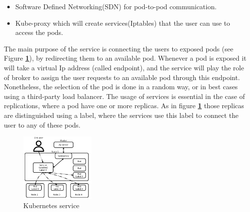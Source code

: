 \documentclass[letterpaper,twocolumn,10pt]{article}
\let\origref\ref
\def\ref#1{\textbf{\origref{#1}}}
\begin{document}
\begin{itemize}
	\item Software Defined Networking(SDN) for pod-to-pod communication.
	\item Kube-proxy which will create services(Iptables) that the user can use to access the pods. 
\end{itemize}
The main purpose of the service is connecting the users to exposed pods (see Figure \ref{fig:svc}), by redirecting them to an available pod. Whenever a pod is exposed it will take a virtual Ip address (called endpoint), and the service will play the role of broker to assign the user requests to an available pod through this endpoint. Nonetheless, the selection of the pod is done in a random way, or in best cases using a third-party load balancer. The usage of services is essential in the case of replications, where a pod have one or more replicas. As in figure \ref{fig:svc} those replicas are distinguished using a label, where the services use this label to connect the user to any of these pods.    
\begin{figure}[t]
\centering\includegraphics[width=0.33\textwidth]{images/svc.png}
\caption{Kubernetes service}
\label{fig:svc}
\end{figure}

\end{document}
